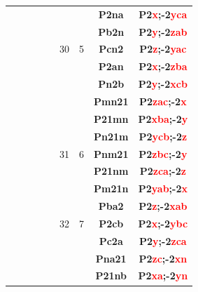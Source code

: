 \documentclass{article}      %
\begin{document}
\begin{small}
\begin{longtable}[c]{|c|c|c|c|c|c|c|c|c|}
          &  & & & &  & &\textbf{P2na}         &\textbf{P2\textcolor{red}{x};-2\textcolor{red}{yca}}\\\cline{8-9}         
          &  & & & &  & &\textbf{Pb2n}         &\textbf{P2\textcolor{red}{y};-2\textcolor{red}{zab}}\\\cline{8-9}         
	  &  & & & &\textrm{30}  &\textrm{5} &\textbf{Pcn2}         &\textbf{P2\textcolor{red}{z};-2\textcolor{red}{yac}}\\\cline{8-9}         
          &  & & & &  & &\textbf{P2an}         &\textbf{P2\textcolor{red}{x};-2\textcolor{red}{zba}}\\\cline{8-9}         
          &  & & & &  & &\textbf{Pn2b}         &\textbf{P2\textcolor{red}{y};-2\textcolor{red}{xcb}}\\\cline{6-9}         
          &  & & & &  & &\textbf{Pmn21}       &\textbf{P2\textcolor{red}{zac};-2\textcolor{red}{x}}\\\cline{8-9}         
          &  & & & &  & &\textbf{P21mn}       &\textbf{P2\textcolor{red}{xba};-2\textcolor{red}{y}}\\\cline{8-9}         
          &  & & & &  & &\textbf{Pn21m}       &\textbf{P2\textcolor{red}{ycb};-2\textcolor{red}{z}}\\\cline{8-9}         
	  &  & & & &\textrm{31}  &\textrm{6} &\textbf{Pnm21}       &\textbf{P2\textcolor{red}{zbc};-2\textcolor{red}{y}}\\\cline{8-9}         
          &  & & & &  & &\textbf{P21nm}       &\textbf{P2\textcolor{red}{zca};-2\textcolor{red}{z}}\\\cline{8-9}         
          &  & & & &  & &\textbf{Pm21n}       &\textbf{P2\textcolor{red}{yab};-2\textcolor{red}{x}}\\\cline{6-9}         
          &  & & & &  & &\textbf{Pba2}         &\textbf{P2\textcolor{red}{z};-2\textcolor{red}{xab}}\\\cline{8-9}         
	  &  & & & &\textrm{32}  &\textrm{7} &\textbf{P2cb}         &\textbf{P2\textcolor{red}{x};-2\textcolor{red}{ybc}}\\\cline{8-9}         
          &  & & & &  & &\textbf{Pc2a}         &\textbf{P2\textcolor{red}{y};-2\textcolor{red}{zca}}\\\cline{6-9}         
          &  & & & &  & &\textbf{Pna21}       &\textbf{P2\textcolor{red}{zc};-2\textcolor{red}{xn}}\\\cline{8-9}         
          &  & & & &  & &\textbf{P21nb}       &\textbf{P2\textcolor{red}{xa};-2\textcolor{red}{yn}}\\\cline{8-9}         

\end{longtable}
\end{small}
\end{document}
